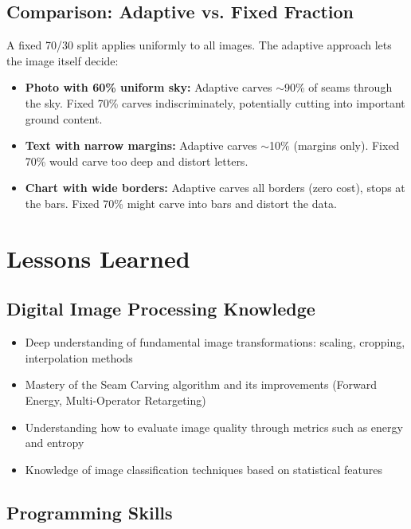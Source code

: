 \documentclass[12pt,a4paper]{article}
\begin{document}
\subsection{Comparison: Adaptive vs. Fixed Fraction}

A fixed 70/30 split applies uniformly to all images. The adaptive approach lets the image itself decide:

\begin{itemize}
    \item \textbf{Photo with 60\% uniform sky:} Adaptive carves $\sim$90\% of seams through the sky. Fixed 70\% carves indiscriminately, potentially cutting into important ground content.
    \item \textbf{Text with narrow margins:} Adaptive carves $\sim$10\% (margins only). Fixed 70\% would carve too deep and distort letters.
    \item \textbf{Chart with wide borders:} Adaptive carves all borders (zero cost), stops at the bars. Fixed 70\% might carve into bars and distort the data.
\end{itemize}

\newpage
\section{Lessons Learned}

\subsection{Digital Image Processing Knowledge}

\begin{itemize}
    \item Deep understanding of fundamental image transformations: scaling, cropping, interpolation methods
    \item Mastery of the Seam Carving algorithm and its improvements (Forward Energy, Multi-Operator Retargeting)
    \item Understanding how to evaluate image quality through metrics such as energy and entropy
    \item Knowledge of image classification techniques based on statistical features
\end{itemize}

\subsection{Programming Skills}
\end{document}
